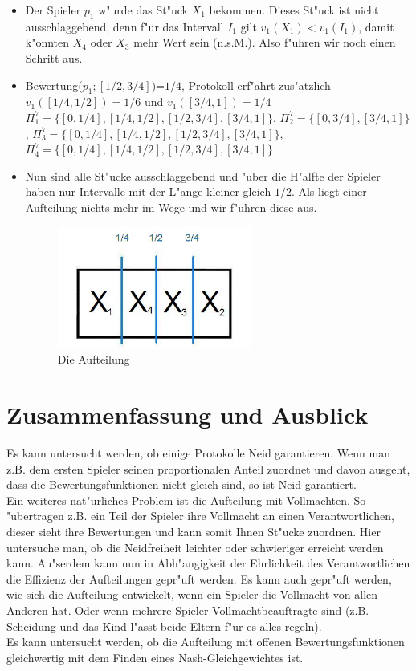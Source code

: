 \documentclass[11pt, a4paper, twoside]{article}
\numberwithin{equation}{section}
\begin{document}
\begin{itemize}
\item Der Spieler $p_1$ w"urde das St"uck $X_1$ bekommen. Dieses St"uck ist nicht ausschlaggebend, denn f"ur das Intervall $I_1$ gilt $v_1(X_1)<v_1(I_1)$, damit k"onnten $X_4$ oder $X_3$ mehr Wert sein (n.s.M.). Also f"uhren wir noch einen Schritt aus.
\item  Bewertung($p_1;[1/2,3/4]$)=$1/4$, Protokoll erf"ahrt zus"atzlich $v_1([1/4,1/2])=1/6$ und $v_1([3/4,1])=1/4$ \\ $\Pi_1^7=\{[0,1/4],[1/4,1/2],[1/2,3/4],[3/4,1]\}$, $\Pi_2^7=\{[0,3/4],[3/4,1]\}$, $\Pi_3^7=\{[0,1/4],[1/4,1/2],[1/2,3/4],[3/4,1]\}$, $\Pi_4^7=\{[0,1/4],[1/4,1/2],[1/2,3/4],[3/4,1]\}$
\item Nun sind alle St"ucke ausschlaggebend und "uber die H"alfte der Spieler haben nur Intervalle mit der L"ange kleiner gleich $1/2$. Als liegt einer Aufteilung nichts mehr im Wege und wir f"uhren diese aus.
\begin{figure}[h!]
\center
\includegraphics[height=4cm]{kk4.jpg}
\caption[Beispiel zu Procaccias Teilungsspiel]{Die Aufteilung}
\end{figure}  
\end{itemize}
\section{Zusammenfassung und Ausblick}
Es kann untersucht werden, ob einige Protokolle Neid garantieren. Wenn man z.B. dem ersten Spieler seinen proportionalen Anteil zuordnet und davon ausgeht, dass die Bewertungsfunktionen nicht gleich sind, so ist Neid garantiert.\\
Ein weiteres nat"urliches Problem ist die Aufteilung mit Vollmachten. So "ubertragen z.B. ein Teil der Spieler ihre Vollmacht an einen Verantwortlichen, dieser sieht ihre Bewertungen und kann somit Ihnen St"ucke zuordnen. Hier untersuche man, ob die Neidfreiheit leichter oder schwieriger erreicht werden kann. Au"serdem kann nun in Abh"angigkeit der Ehrlichkeit des Verantwortlichen die Effizienz der Aufteilungen gepr"uft werden. Es kann auch gepr"uft werden, wie sich die Aufteilung entwickelt, wenn ein Spieler die Vollmacht von allen Anderen hat. Oder wenn mehrere Spieler Vollmachtbeauftragte sind (z.B. Scheidung und das Kind l"asst beide Eltern f"ur es alles regeln).\\
Es kann untersucht werden, ob die Aufteilung mit offenen Bewertungsfunktionen gleichwertig mit dem Finden eines Nash-Gleichgewichtes ist.\\
\end{document}
